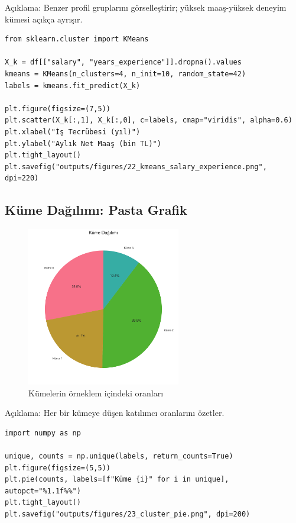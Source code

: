\documentclass[12pt,a4paper]{article}
\begin{document}
\noindent Açıklama: Benzer profil gruplarını görselleştirir; yüksek maaş-yüksek deneyim kümesi açıkça ayrışır.

\begin{lstlisting}[style=python, caption={K-means görselleştirme üretim kodu}]
from sklearn.cluster import KMeans

X_k = df[["salary", "years_experience"]].dropna().values
kmeans = KMeans(n_clusters=4, n_init=10, random_state=42)
labels = kmeans.fit_predict(X_k)

plt.figure(figsize=(7,5))
plt.scatter(X_k[:,1], X_k[:,0], c=labels, cmap="viridis", alpha=0.6)
plt.xlabel("İş Tecrübesi (yıl)")
plt.ylabel("Aylık Net Maaş (bin TL)")
plt.tight_layout()
plt.savefig("outputs/figures/22_kmeans_salary_experience.png", dpi=220)
\end{lstlisting}

\subsection{Küme Dağılımı: Pasta Grafik}
\begin{figure}[H]
    \centering
    \includegraphics[width=0.6\textwidth]{23_cluster_pie.png}
    \caption{Kümelerin örneklem içindeki oranları}
\end{figure}

\noindent Açıklama: Her bir kümeye düşen katılımcı oranlarını özetler.

\begin{lstlisting}[style=python, caption={Küme oranları pasta grafiği üretim kodu}]
import numpy as np

unique, counts = np.unique(labels, return_counts=True)
plt.figure(figsize=(5,5))
plt.pie(counts, labels=[f"Küme {i}" for i in unique], autopct="%1.1f%%")
plt.tight_layout()
plt.savefig("outputs/figures/23_cluster_pie.png", dpi=200)
\end{lstlisting}
\end{document}
